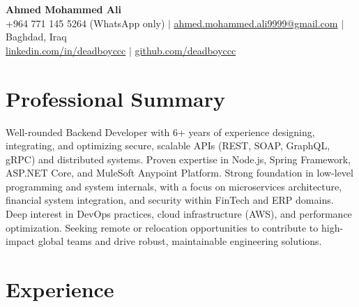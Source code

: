 \documentclass[11pt]{article}
\begin{document}
\begin{center}
  {\LARGE \textbf{Ahmed Mohammed Ali}}\\[0.2cm]
  +964 771 145 5264 (WhatsApp only) $\vert$ \href{mailto:ahmed.mohammed.ali9999@gmail.com}{ahmed.mohammed.ali9999@gmail.com} $\vert$ Baghdad, Iraq\\
  \href{https://www.linkedin.com/in/deadboyccc}{linkedin.com/in/deadboyccc} $\vert$ \href{https://github.com/deadboyccc}{github.com/deadboyccc}
\end{center}

\vspace{0.2cm}
\section*{Professional Summary}
Well-rounded Backend Developer with 6+ years of experience designing, integrating, and optimizing secure, scalable APIs (REST, SOAP, GraphQL, gRPC) and distributed systems. Proven expertise in Node.js, Spring Framework, ASP.NET Core, and MuleSoft Anypoint Platform. Strong foundation in low-level programming and system internals, with a focus on microservices architecture, financial system integration, and security within FinTech and ERP domains. Deep interest in DevOps practices, cloud infrastructure (AWS), and performance optimization. Seeking remote or relocation opportunities to contribute to high-impact global teams and drive robust, maintainable engineering solutions.

\vspace{0.2cm}
\section*{Experience}
\end{document}
